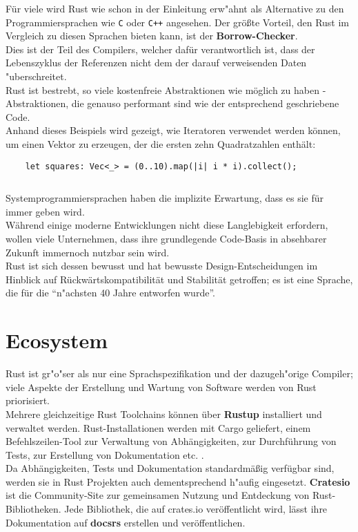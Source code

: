 Für viele wird Rust wie schon  in der Einleitung erw"ahnt als Alternative zu den Programmiersprachen wie \texttt{C} oder \texttt{C++} angesehen. Der größte Vorteil, den Rust im Vergleich zu diesen Sprachen bieten kann, ist der \textbf{Borrow-Checker}.\\
Dies ist der Teil des Compilers, welcher dafür verantwortlich ist, dass der Lebenszyklus der Referenzen nicht dem der darauf verweisenden Daten "uberschreitet.\\
Rust ist bestrebt, so viele kostenfreie Abstraktionen wie möglich zu haben - Abstraktionen, die genauso performant sind wie der entsprechend geschriebene Code.\\

Anhand dieses Beispiels wird gezeigt, wie Iteratoren verwendet werden können, um einen Vektor zu erzeugen, der die ersten zehn Quadratzahlen enthält:

\begin{verbatim}
    let squares: Vec<_> = (0..10).map(|i| i * i).collect();
\end{verbatim}
\begin{lstlisting}[caption={Abstrakte Iteration}, label={lst:abstract}]
\end{lstlisting}

Systemprogrammiersprachen haben die implizite Erwartung, dass es sie für immer geben wird. \\
Während einige moderne Entwicklungen nicht diese Langlebigkeit erfordern, wollen viele Unternehmen, dass ihre grundlegende Code-Basis in absehbarer Zukunft immernoch nutzbar sein wird.\\
Rust ist sich dessen bewusst und hat bewusste Design-Entscheidungen im Hinblick auf Rückwärtskompatibilität und Stabilität getroffen; es ist eine Sprache, die für die \enquote{n"achsten 40 Jahre entworfen wurde}.

\section{Ecosystem}
Rust ist gr"o"ser als nur eine Sprachspezifikation und der dazugeh"orige Compiler; viele Aspekte der Erstellung und Wartung von Software werden von Rust priorisiert.\\
Mehrere gleichzeitige Rust Toolchains können über \textbf{Rustup} \autocite{rustup} installiert und verwaltet werden. Rust-Installationen werden mit Cargo geliefert, einem Befehlszeilen-Tool zur Verwaltung von Abhängigkeiten, zur Durchführung von Tests, zur Erstellung von Dokumentation etc. .\\
Da Abhängigkeiten, Tests und Dokumentation standardmäßig verfügbar sind, werden sie in Rust Projekten auch dementsprechend h"aufig eingesetzt. \textbf{Cratesio} \autocite{cratesio} ist die Community-Site zur gemeinsamen Nutzung und Entdeckung von Rust-Bibliotheken. Jede Bibliothek, die auf crates.io veröffentlicht wird, lässt ihre Dokumentation auf \textbf{docsrs} \autocite{docsrs} erstellen und veröffentlichen.\\

